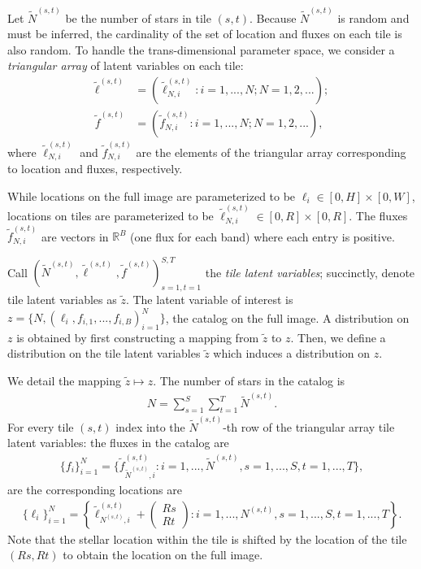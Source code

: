 Let $\tilde N^{(s, t)}$ be the number of stars in tile 
$(s,t)$.
Because $\tilde N^{(s, t)}$ is random and must be inferred, 
the cardinality of the set of location and fluxes on each tile
is also random. 
To handle the trans-dimensional parameter space, 
we consider a {\itshape triangular array} of latent variables
on each tile:
\begin{align}
    \tilde\ell^{(s, t)} &= (\tilde\ell_{N, i}^{(s, t)} : i = 1, ..., N; N = 1, 2, ...); \\
    \tilde f^{(s, t)} &= (\tilde f_{N, i}^{(s, t)} : i = 1, ..., N; N = 1, 2, ...),
\end{align}
where $\tilde\ell_{N, i}^{(s, t)}$ and $\tilde f_{N, i}^{(s, t)}$ are the elements of the triangular array corresponding to location and fluxes, respectively. 

While locations on the full image are parameterized to be
$\ell_i \in [0, H]\times[0, W]$, locations on tiles are parameterized to be $\tilde\ell_{N, i}^{(s, t)} \in [0, R]\times[0, R]$. The fluxes $\tilde f_{N, i}^{(s, t)}$ are vectors in $\mathbb{R}^B$ (one flux for each band) where each entry is positive. 

Call $(\tilde N^{(s, t)}, \tilde \ell^{(s, t)}, \tilde f^{(s, t)})_{s=1,t=1}^{S,T}$ the {\itshape tile latent variables}; 
succinctly, denote tile latent variables as $\tilde z$. 
The latent variable of interest is $z = \{N, (\ell_i, f_{i,1}, ..., f_{i,B})_{i = 1}^N\}$, the catalog on the full image. 
A distribution on $z$ is obtained by first constructing a mapping from $\tilde z$ to $z$. Then, we define a distribution 
on the tile latent variables $\tilde z$ which induces 
a distribution on $z$.  

We detail the mapping $\tilde z\mapsto z$. 
The number of stars in the catalog is 
\begin{align}
    N = \sum_{s=1}^{S}\sum_{t=1}^T \tilde N^{(s, t)}. 
\end{align}
For every tile $(s,t)$ index into the $\tilde N^{(s,t)}$-th
row of the triangular array tile latent variables:
the fluxes in the catalog are
\begin{align}
    \{f_i\}_{i=1}^N = \Big\{\tilde f_{\tilde N^{(s, t)}, i}^{(s, t)} : i = 1, ..., \tilde N^{(s, t)}, s = 1, ..., S, t = 1, ..., T \Big\},
\end{align}
are the corresponding locations are
\begin{align}
    \{\ell_i\}_{i = 1}^N = \left\{\tilde \ell_{N^{(s, t)}, i}^{(s, t)} + 
    \begin{pmatrix}
    Rs \\ Rt
    \end{pmatrix} 
    : i = 1, ..., N^{(s, t)}, s = 1, ..., S, t = 1, ..., T\right\}.
\end{align}
Note that the stellar location within the tile is shifted by the location of the tile $(Rs, Rt)$ to obtain the location on the full image. 

